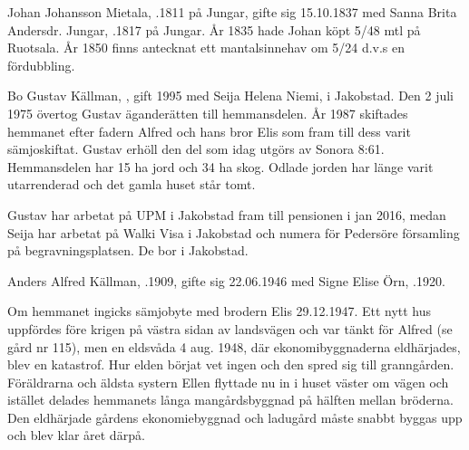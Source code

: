 Johan Johansson Mietala, .1811 på Jungar, gifte sig 15.10.1837 med Sanna Brita Andersdr. Jungar, .1817 på Jungar. År 1835 hade Johan köpt 5/48 mtl på Ruotsala. År 1850 finns antecknat ett mantalsinnehav om 5/24 d.v.s en fördubbling.
\begin{jhchildren}
  \item {}
  \item {}
  \item {}
  \item {}
  \item {}
  \item {}
  \item {}
  \item {}
\end{jhchildren}




Bo Gustav Källman, , gift 1995 med Seija Helena Niemi,  i Jakobstad. Den 2 juli 1975 övertog Gustav äganderätten till hemmansdelen. År 1987 skiftades hemmanet efter fadern Alfred och hans bror Elis som fram till dess varit sämjoskiftat. Gustav erhöll den del som idag utgörs av Sonora 8:61. Hemmansdelen har 15 ha jord och 34 ha skog. Odlade jorden har länge varit utarrenderad och det gamla huset står tomt.

Gustav har arbetat på UPM i Jakobstad fram till pensionen i jan 2016, medan Seija har arbetat på Walki Visa i Jakobstad och numera för Pedersöre församling på begravningsplatsen. De bor i Jakobstad.
\begin{jhchildren}
  \item {}
  \item {}
\end{jhchildren}


Anders Alfred Källman, .1909, gifte sig 22.06.1946 med Signe Elise Örn, .1920.

Om hemmanet ingicks sämjobyte med brodern Elis 29.12.1947. Ett nytt hus uppfördes före krigen på västra sidan av landsvägen och var tänkt för Alfred (se gård nr 115), men en eldsvåda 4 aug. 1948, där ekonomibyggnaderna eldhärjades, blev en katastrof. Hur elden börjat vet ingen och den spred sig till granngården. Föräldrarna och äldsta systern Ellen flyttade nu in i huset väster om vägen och istället delades hemmanets långa mangårdsbyggnad på hälften mellan bröderna. Den eldhärjade gårdens ekonomiebyggnad och ladugård måste snabbt byggas upp och blev klar året därpå.

